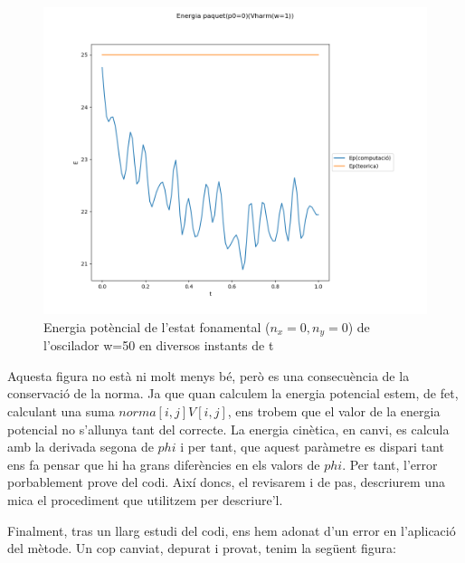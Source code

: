 \documentclass{article}
\begin{document}
\begin{figure}[H]
	\includegraphics[width=\textwidth]{energiaharmdiscretitzatpot.png}
	\caption{Energia potèncial de l'estat fonamental (\(n_x=0,n_y=0\)) de l'oscilador w=50 en diversos instants de t}
\end{figure}

Aquesta figura no està ni molt menys bé, però es una consecuència de la conservació de la norma. Ja que quan calculem la energia potencial estem, de fet, calculant una suma \(norma[i,j]V[i,j]\), ens trobem que el valor de la energia potencial no s'allunya tant del correcte. La energia cinètica, en canvi, es calcula amb la derivada segona de \(phi\) i per tant, que aquest paràmetre es dispari tant ens fa pensar que hi ha grans diferències en els valors de \(phi\). Per tant, l'error porbablement prove del codi. Així doncs, el revisarem i de pas, descriurem una mica el procediment que utilitzem per descriure'l.

Finalment, tras un llarg estudi del codi, ens hem adonat d'un error en l'aplicació del mètode. Un cop canviat, depurat i provat, tenim la següent figura:
\end{document}
